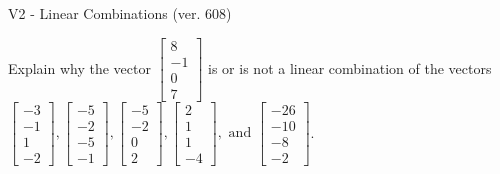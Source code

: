 \begin{exercise}
  \begin{exerciseTitle}V2 - Linear Combinations (ver. 608)\end{exerciseTitle}
  \begin{exerciseStatement}
    Explain why the vector \(\left[\begin{array}{c}
8 \\
-1 \\
0 \\
7
\end{array}\right]\)  is or is not a linear 
	combination of the vectors \(\left[\begin{array}{c}
-3 \\
-1 \\
1 \\
-2
\end{array}\right] , \left[\begin{array}{c}
-5 \\
-2 \\
-5 \\
-1
\end{array}\right] , \left[\begin{array}{c}
-5 \\
-2 \\
0 \\
2
\end{array}\right] , \left[\begin{array}{c}
2 \\
1 \\
1 \\
-4
\end{array}\right] , \text{ and } \left[\begin{array}{c}
-26 \\
-10 \\
-8 \\
-2
\end{array}\right]\).
	



\end{exerciseStatement}
\end{exercise}
